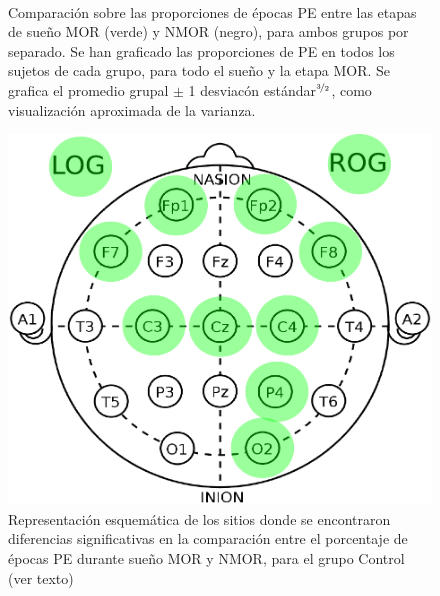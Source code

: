 \documentclass[12pt,a4paper]{mitthesis}
\begin{document}
\begin{figure}
\centering
{}\\
\caption{Comparaci\'on sobre las proporciones de \'epocas PE entre las etapas de sue\~no MOR 
(verde) y NMOR (negro), para ambos grupos por separado. Se han graficado las proporciones de PE en 
todos los sujetos de cada grupo, para todo el sue\~no y la etapa MOR.
Se grafica el promedio grupal $\pm$ 1 desviac\'on est\'andar$^{\nicefrac{3}{2}}$, como 
visualizaci\'on aproximada de la varianza.}
\label{comparacion_verde}
\end{figure}

\begin{figure}
\centering
\includegraphics[width=0.4\linewidth]
{cabecita.pdf} 
\caption{Representaci\'on esquem\'atica de los sitios donde se encontraron diferencias 
significativas en la comparaci\'on entre el porcentaje de \'epocas PE durante sue\~no MOR y NMOR, 
para el grupo Control (ver texto)}
\label{cabecita}
\end{figure}
\end{document}
